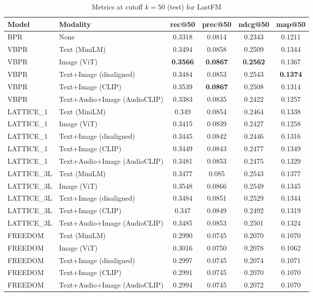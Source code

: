 \begin{table}[H]
    \centering
    \begin{adjustbox}{max width=\textwidth}
    \begin{tabular}{|l|l|c|c|c|c|}
    \hline
    	\textbf{Model} & \textbf{Modality} & \textbf{rec@50} & \textbf{prec@50} & \textbf{ndcg@50} & \textbf{map@50} \\
    \hline
    BPR & None & 0.3318 & 0.0814 & 0.2343 & 0.1211 \\
    \hline
    VBPR & Text (MiniLM) & 0.3494 & 0.0858 & 0.2509 & 0.1344 \\
    \hline
    VBPR & Image (ViT) & \textbf{0.3566} & \textbf{0.0867} & \textbf{0.2562} & 0.1367 \\
    \hline
    VBPR & Text+Image (disaligned) & 0.3484 & 0.0853 & 0.2543 & \textbf{0.1374} \\
    \hline
    VBPR & Text+Image (CLIP) & 0.3539 & \textbf{0.0867} & 0.2508 & 0.1314 \\
    \hline
    VBPR & Text+Audio+Image (AudioCLIP) & 0.3383 & 0.0835 & 0.2422 & 0.1257 \\
    \hline
    LATTICE\_1 & Text (MiniLM) & 0.349 & 0.0854 & 0.2464 & 0.1338 \\
    \hline
    LATTICE\_1 & Image (ViT) & 0.3415 & 0.0839 & 0.2427 & 0.1258 \\
    \hline
    LATTICE\_1 & Text+Image (disaligned) & 0.3445 & 0.0842 & 0.2446 & 0.1316 \\
    \hline
    LATTICE\_1 & Text+Image (CLIP) & 0.3449 & 0.0843 & 0.2477 & 0.1349 \\
    \hline
    LATTICE\_1 & Text+Audio+Image (AudioCLIP) & 0.3481 & 0.0853 & 0.2475 & 0.1329 \\
    \hline
    LATTICE\_3L & Text (MiniLM) & 0.3477 & 0.085 & 0.2543 & 0.1377 \\
    \hline
    LATTICE\_3L & Image (ViT) & 0.3548 & 0.0866 & 0.2549 & 0.1345 \\
    \hline
    LATTICE\_3L & Text+Image (disaligned) & 0.3484 & 0.0851 & 0.2529 & 0.1344 \\
    \hline
    LATTICE\_3L & Text+Image (CLIP) & 0.347 & 0.0849 & 0.2492 & 0.1319 \\
    \hline
    LATTICE\_3L & Text+Audio+Image (AudioCLIP) & 0.3485 & 0.0853 & 0.2501 & 0.1324 \\
    \hline
    FREEDOM & Text (MiniLM) & 0.2990 & 0.0745 & 0.2070 & 0.1070 \\
    \hline
    FREEDOM & Image (ViT) & 0.3016 & 0.0750 & 0.2078 & 0.1062 \\
    \hline
    FREEDOM & Text+Image (disaligned) & 0.2997 & 0.0745 & 0.2074 & 0.1071 \\
    \hline
    FREEDOM & Text+Image (CLIP) & 0.2991 & 0.0745 & 0.2070 & 0.1070 \\
    \hline
    FREEDOM & Text+Audio+Image (AudioCLIP) & 0.2994 & 0.0745 & 0.2072 & 0.1070 \\
    \hline
    \end{tabular}
    \end{adjustbox}
    \caption{Metrics at cutoff $k=50$ (test) for LastFM}
    \label{tab:metrics_lastfm_k50}
\end{table}


